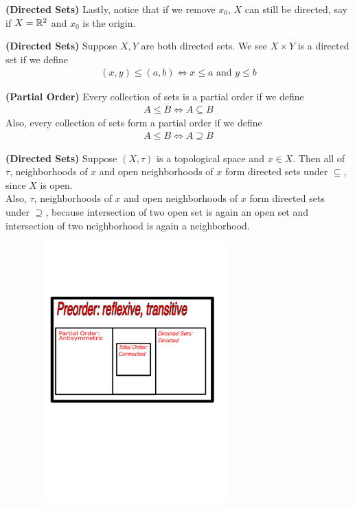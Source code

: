\documentclass{report}
\begin{document}
\begin{mdframed}
\begin{Example}{\textbf{(Directed Sets)}}{}
Lastly, notice that if we remove $x_0$,  $X$ can still be directed, say if $X=\mathbb{R}^2$ and $x_0$ is the origin.
\end{Example}
\begin{Example}{\textbf{(Directed Sets)}}{}
  \vspace{1cm}
Suppose $X,Y$ are both directed sets. We see $X\times Y$ is a directed set if we define 
\begin{align*}
  (x,y)\leq (a,b)\iff  x\leq a\text{ and }y\leq b  
\end{align*}
\end{Example}
\begin{Example}{\textbf{(Partial Order)}}{}
  \vspace{1cm}
Every collection of sets is a partial order if we define 
\begin{align*}
A\leq B \iff  A\subseteq B
\end{align*}
Also, every collection of sets form a partial order if we define 
\begin{align*}
A\leq B \iff  A \supseteq B
\end{align*}
\end{Example}
\begin{Example}{\textbf{(Directed Sets)}}{}
  \vspace{1cm}
Suppose $(X,\tau)$ is a topological space and  $x \in X$. Then all of $\tau$, neighborhoods of $x$ and open neighborhoods of  $x$ form directed sets under $\subseteq $, since $X$ is open.\\

Also, $\tau$, neighborhoods of $x$ and open neighborhoods of  $x$ form directed sets under  $\supseteq$, because intersection of two open set is again an open set and intersection of two neighborhood is again a neighborhood.
\end{Example}
\includegraphics[height=10cm,width=10cm]{drawing.pdf}
\end{mdframed}
\end{document}
